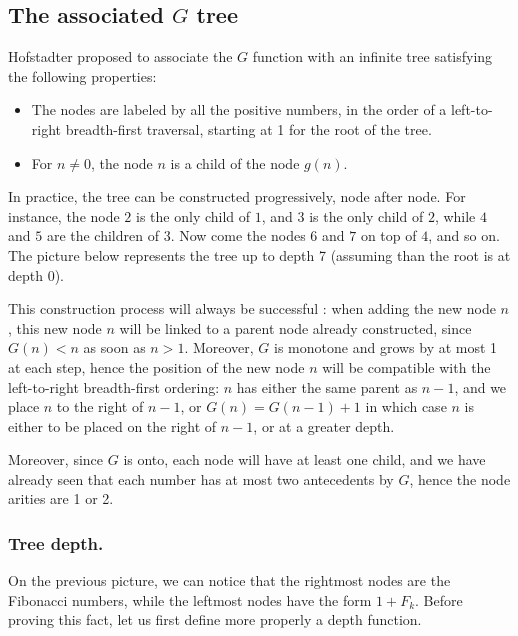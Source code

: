 \documentclass[a4paper,11pt]{article}
\begin{document}
\subsection{The associated $G$ tree}

Hofstadter proposed to associate the $G$ function with an infinite
tree satisfying the following properties:
\begin{itemize}
\item The nodes are labeled by all the positive numbers,
 in the order of a left-to-right breadth-first traversal,
 starting at 1 for the root of the tree.
\item For $n\neq 0$, the node $n$ is a child of the node $g(n)$.
\end{itemize}

In practice, the tree can be constructed progressively, node after node.
For instance, the node $2$ is the only child of $1$, and $3$
is the only child of $2$, while $4$ and $5$ are the children of $3$.
Now come the nodes $6$ and $7$ on top of $4$, and so on. The picture
below represents the tree up to depth 7 (assuming than the root is
at depth 0).

\bigskip


This construction process will always be successful : when adding the
new node $n$, this new node $n$ will be linked
to a parent node already constructed, since $G(n)<n$ as soon as $n>1$.
Moreover, $G$ is monotone and
grows by at most 1 at each step, hence the position of the new node
$n$ will be compatible with the left-to-right breadth-first ordering:
$n$ has either the same parent as $n-1$, and we place $n$ to the right
of $n-1$, or $G(n)=G(n-1)+1$ in which case $n$ is either to be placed
on the right of $n-1$, or at a greater depth.

Moreover, since $G$ is onto, each node will have at least one child,
and we have already seen that each number has at most two antecedents
by $G$, hence the node arities are 1 or 2.

\subsubsection*{Tree depth.}
On the previous picture, we can notice that the rightmost nodes are
the Fibonacci numbers, while the leftmost nodes have the form $1+F_k$.
Before proving this fact, let us first define more properly a depth
function.
\end{document}
